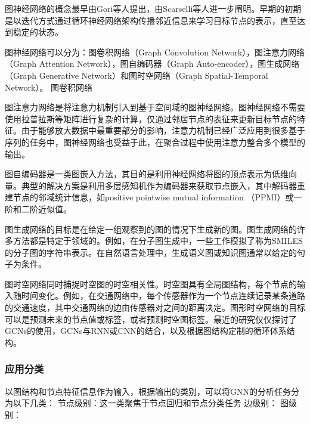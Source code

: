 图神经网络的概念最早由Gori\cite{gori2005new}等人提出，由Scarselli\cite{scarselli2008graph}等人进一步阐明。早期的初期是以迭代方式通过循环神经网络架构传播邻近信息来学习目标节点的表示，直至达到稳定的状态。


图神经网络可以分为：图卷积网络（Graph Convolution Network），图注意力网络（Graph Attention Network），图自编码器（Graph Auto-encoder），图生成网络（Graph Generative Network）和图时空网络（Graph Spatial-Temporal Network）。
图卷积网络

图注意力网络是将注意力机制引入到基于空间域的图神经网络。图神经网络不需要使用拉普拉斯等矩阵进行复杂的计算，仅通过邻居节点的表征来更新目标节点的特征。由于能够放大数据中最重要部分的影响，注意力机制已经广泛应用到很多基于序列的任务中，图神经网络也受益于此，在聚合过程中使用注意力整合多个模型的输出。

图自编码器是一类图嵌入方法，其目的是利用神经网络将图的顶点表示为低维向量。典型的解决方案是利用多层感知机作为编码器来获取节点嵌入，其中解码器重建节点的邻域统计信息，如positive pointwise mutual information （PPMI）或一阶和二阶近似值。

图生成网络的目标是在给定一组观察到的图的情况下生成新的图。图生成网络的许多方法都是特定于领域的。例如，在分子图生成中，一些工作模拟了称为SMILES的分子图的字符串表示。在自然语言处理中，生成语义图或知识图通常以给定的句子为条件。

图时空网络同时捕捉时空图的时空相关性。时空图具有全局图结构，每个节点的输入随时间变化。例如，在交通网络中，每个传感器作为一个节点连续记录某条道路的交通速度，其中交通网络的边由传感器对之间的距离决定。图形时空网络的目标可以是预测未来的节点值或标签，或者预测时空图标签。最近的研究仅仅探讨了GCNs的使用，GCNs与RNN或CNN的结合，以及根据图结构定制的循环体系结构。

\subsubsection{应用分类}
以图结构和节点特征信息作为输入，根据输出的类别，可以将GNN的分析任务分为以下几类：
节点级别：这一类聚焦于节点回归和节点分类任务
边级别：
图级别：


